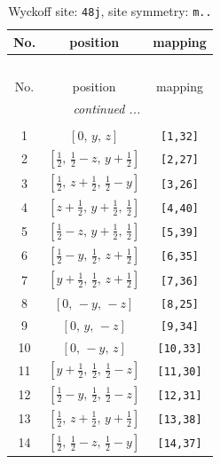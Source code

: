 \documentclass[fleqn,8pt]{jsarticle}
\begin{document}
\begin{longtable}{ccc}
\caption{Wyckoff site: {\tt 48j}, site symmetry: {\tt m..}}
 \\
 \hline \hline
No. & position & mapping \\ \hline \endfirsthead

\multicolumn{2}{l}{\tablename\ \thetable{}} \\
 \hline \hline
No. & position & mapping \\ \hline \endhead

 \hline \hline
\multicolumn{2}{r}{\footnotesize\it continued ...} \\ \endfoot

 \hline \hline
\multicolumn{2}{r}{} \\ \endlastfoot

1 & $\left[ 0,\, y,\, z \right]$ & {\tt [1,32]} \\ \hline
2 & $\left[ \frac{1}{2},\, \frac{1}{2} - z,\, y + \frac{1}{2} \right]$ & {\tt [2,27]} \\ \hline
3 & $\left[ \frac{1}{2},\, z + \frac{1}{2},\, \frac{1}{2} - y \right]$ & {\tt [3,26]} \\ \hline
4 & $\left[ z + \frac{1}{2},\, y + \frac{1}{2},\, \frac{1}{2} \right]$ & {\tt [4,40]} \\ \hline
5 & $\left[ \frac{1}{2} - z,\, y + \frac{1}{2},\, \frac{1}{2} \right]$ & {\tt [5,39]} \\ \hline
6 & $\left[ \frac{1}{2} - y,\, \frac{1}{2},\, z + \frac{1}{2} \right]$ & {\tt [6,35]} \\ \hline
7 & $\left[ y + \frac{1}{2},\, \frac{1}{2},\, z + \frac{1}{2} \right]$ & {\tt [7,36]} \\ \hline
8 & $\left[ 0,\, - y,\, - z \right]$ & {\tt [8,25]} \\ \hline
9 & $\left[ 0,\, y,\, - z \right]$ & {\tt [9,34]} \\ \hline
10 & $\left[ 0,\, - y,\, z \right]$ & {\tt [10,33]} \\ \hline
11 & $\left[ y + \frac{1}{2},\, \frac{1}{2},\, \frac{1}{2} - z \right]$ & {\tt [11,30]} \\ \hline
12 & $\left[ \frac{1}{2} - y,\, \frac{1}{2},\, \frac{1}{2} - z \right]$ & {\tt [12,31]} \\ \hline
13 & $\left[ \frac{1}{2},\, z + \frac{1}{2},\, y + \frac{1}{2} \right]$ & {\tt [13,38]} \\ \hline
14 & $\left[ \frac{1}{2},\, \frac{1}{2} - z,\, \frac{1}{2} - y \right]$ & {\tt [14,37]} \\ \hline

\end{longtable}
\end{document}
